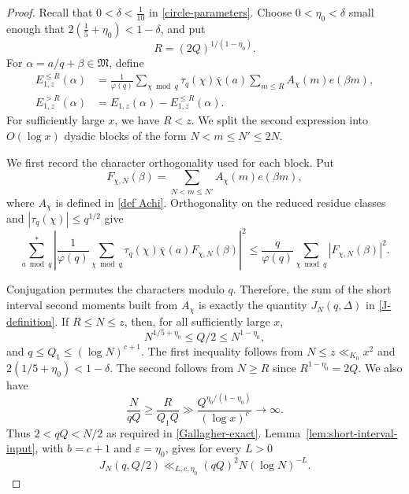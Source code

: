 \documentclass[12pt,reqno]{amsart}
\numberwithin{equation}{section}
\theoremstyle{plain}
\theoremstyle{remark}
\newcommand{\majorarc}{\mathfrak{M}}
\begin{document}
\begin{proof}
Recall that $0<\delta<\frac1{10}$ in \eqref{circle-parameters}.
Choose $0<\eta_0<\delta$ small enough that
$2(\frac15+\eta_0)<1-\delta$, and put
\[
 R=(2Q)^{1/(1-\eta_0)}.
\]
For $\alpha=a/q+\beta\in\majorarc$, define
\begin{align*}
 E_{1,z}^{\leq R}(\alpha)
  &=\frac1{\varphi(q)}
    \sum_{\chi\bmod q}\tau_q(\chi)\overline\chi(a)
    \sum_{m\leq R}A_\chi(m)e(\beta m),\\
 E_{1,z}^{>R}(\alpha)
  &=E_{1,z}(\alpha)-E_{1,z}^{\leq R}(\alpha).
\end{align*}
For sufficiently large $x$, we have $R<z$.
We split the second expression into $O(\log x)$ dyadic blocks of the form
$N<m\leq N'\leq2N$.

We first record the character orthogonality used for each block.
Put
\[
 F_{\chi,N}(\beta)
 =\sum_{N<m\leq N'}A_\chi(m)e(\beta m),
\]
where $A_\chi$ is defined in \eqref{def Achi}.
Orthogonality on the reduced residue classes and
$|\tau_q(\chi)|\leq q^{1/2}$ give
\begin{equation}\label{E1-character-orthogonality}
 \sum_{a\bmod q}^{*}
 \left|
  \frac1{\varphi(q)}
  \sum_{\chi\bmod q}
  \tau_q(\chi)\overline\chi(a)F_{\chi,N}(\beta)
 \right|^2
 \leq
 \frac q{\varphi(q)}
 \sum_{\chi\bmod q}|F_{\chi,N}(\beta)|^2.
\end{equation}

Conjugation permutes the characters modulo $q$.
Therefore, the sum of the short interval second moments built from
$A_\chi$ is exactly the quantity $J_N(q,\Delta)$ in \eqref{J-definition}.
If $R\leq N\leq z$, then, for all sufficiently large $x$,
\begin{equation*}\label{Wolke-range}
 N^{1/5+\eta_0}\leq Q/2\leq N^{1-\eta_0},
\end{equation*}
and $q\leq Q_1\leq(\log N)^{c+1}$.
The first inequality follows from $N\leq z\ll_{K_0}x^2$ and
$2(1/5+\eta_0)<1-\delta$.
The second follows from $N\geq R$ since $R^{1-\eta_0}=2Q$.
We also have
\begin{equation*}\label{Gallagher-parameter-check}
 \frac{N}{qQ}\geq\frac{R}{Q_1Q}
 \gg\frac{Q^{\eta_0/(1-\eta_0)}}{(\log x)^c}\longrightarrow\infty.
\end{equation*}
Thus $2<qQ<N/2$ as required in
\eqref{Gallagher-exact}.
Lemma~\ref{lem:short-interval-input}, with
$b=c+1$ and $\varepsilon=\eta_0$, gives for every $L>0$
\begin{equation}\label{Wolke-Mikawa-bound}
 J_N(q,Q/2)
 \ll_{L,c,\eta_0}(qQ)^2N(\log N)^{-L}.
\end{equation}


\end{proof}
\end{document}
